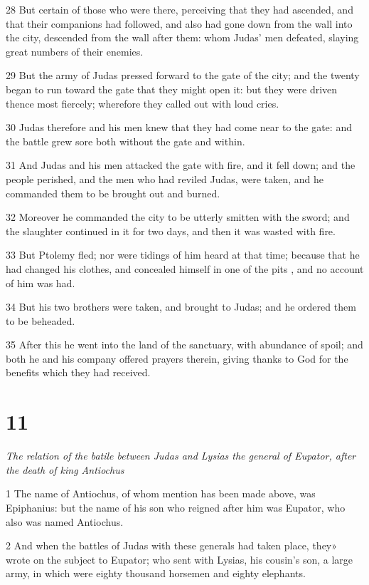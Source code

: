 28 But certain of those who were there, perceiving that they had ascended, and that their companions had followed, and also had gone down from the wall into the city, descended from the wall after them: whom Judas’ men defeated, slaying great numbers of their enemies. 

29 But the army of Judas pressed forward to the gate of the city; and the twenty began to run toward the gate that they might open it: but they were driven thence most fiercely; wherefore they called out with loud cries. 

30 Judas therefore and his men knew that they had come near to the gate: and the battle grew sore both without the gate and within. 

31 And Judas and his men attacked the gate with fire, and it fell down; and the people perished, and the men who had reviled Judas, were taken, and he commanded them to be brought out and burned. 

32 Moreover he commanded the city to be utterly smitten with the sword; and the slaughter continued in it for two days, and then it was wasted with fire. 

33 But Ptolemy fled; nor were tidings of him heard at that time; because that he had changed his clothes, and concealed himself in one of the pits , and no account of him was had. 

34 But his two brothers were taken, and brought to Judas; and he ordered them to be beheaded. 

35 After this he went into the land of the sanctuary, with abundance of spoil; and both he and his company offered prayers therein, giving thanks to God for the benefits which they had received. 


\chapter{11}

\par \textit{The relation of the batile between Judas and Lysias the general of Eupator, after the death of king Antiochus}

1 The name of Antiochus, of whom mention has been made above, was Epiphanius: but the name of his son who reigned after him was Eupator, who also was named Antiochus. 

2 And when the battles of Judas with these generals had taken place, they» wrote on the subject to Eupator; who sent with Lysias, his cousin’s son, a large army, in which were eighty thousand horsemen and eighty elephants. 

